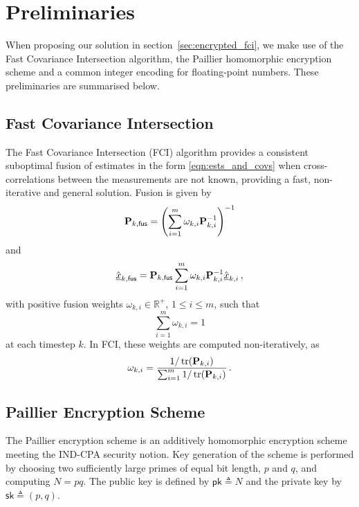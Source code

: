 \documentclass[letterpaper, 10 pt, conference]{ieeeconf}
\begin{document}
\section{Preliminaries}\label{sec:prelims}
When proposing our solution in section~\ref{sec:encrypted_fci}, we make use of the Fast Covariance Intersection algorithm, the Paillier homomorphic encryption scheme and a common integer encoding for floating-point numbers. These preliminaries are summarised below.

\subsection{Fast Covariance Intersection}\label{subsec:fci}
The Fast Covariance Intersection (FCI) algorithm \cite{niehsenInformationFusionBased2002} provides a consistent suboptimal fusion of estimates in the form \eqref{eqn:ests_and_covs} when cross-correlations between the measurements are not known, providing a fast, non-iterative and general solution. Fusion is given by
\begin{equation}\label{eqn:ci_cov_fusion}
    {\ensuremath{{\mathbf{P}}}}_{k,\mathsf{fus}} = \left(\sum_{i=1}^m\omega_{k,i}{{\mathbf{P}}}_{k,i}^{-1}\right)^{-1}
\end{equation}
and
\begin{equation}\label{eqn:ci_est_fusion}
    \hat{{\underline{x}}}_{k,\mathsf{fus}} = {{\mathbf{P}}}_{k,\mathsf{fus}}\sum_{i=1}^m\omega_{k,i}{{\mathbf{P}}}_{k,i}^{-1}\hat{{\underline{x}}}_{k,i}\,,
\end{equation}
with positive fusion weights $\omega_{k,i} \in \mathbb{R}^{+}$, $1\leq i \leq m$, such that 
\begin{equation}
    \sum_{i=1}^m\omega_{k,i}=1
\end{equation}
at each timestep $k$. In FCI, these weights are computed non-iteratively, as
\begin{equation}\label{eqn:fci_weights}
    \omega_{k,i} = \frac{1/\operatorname{tr}({{\mathbf{P}}}_{k,i})}{\sum_{i=1}^m 1/\operatorname{tr}({{\mathbf{P}}}_{k,i})}\,.
\end{equation}

\subsection{Paillier Encryption Scheme}\label{subsec:paillier}
The Paillier encryption scheme \cite{paillierPublicKeyCryptosystemsBased1999,katzIntroductionModernCryptography2008} is an additively homomorphic encryption scheme meeting the IND-CPA security notion. Key generation of the scheme is performed by choosing two sufficiently large primes of equal bit length, $p$ and $q$, and computing $N=pq$. The public key is defined by $\mathsf{pk} \triangleq N$ and the private key by $\mathsf{sk} \triangleq (p,q)$.
\end{document}
